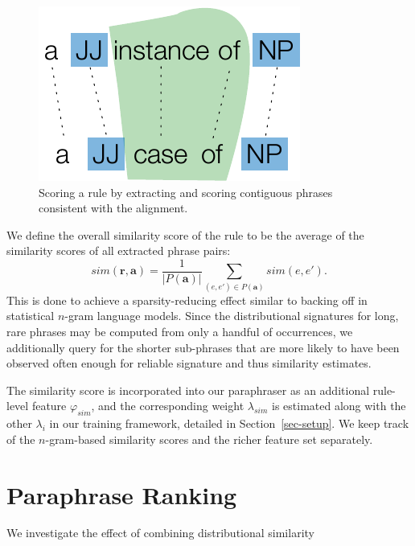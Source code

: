 \documentclass[11pt]{article}
\begin{document}
\begin{figure}[!t]
\begin{center}
\includegraphics[width=0.70\linewidth]{figures/pattern_scoring.pdf}
\end{center}
\caption{Scoring a rule by extracting and scoring contiguous phrases
  consistent with the alignment.}\label{fig-pattern-scoring}
\end{figure}

We define the overall similarity score of the rule to be the average
of the similarity scores of all extracted phrase pairs:
\begin{equation*}
  \mathit{sim}(\mathbf{r}, \mathbf{a}) = \frac{1}{|P(\mathbf{a})|}
  \sum_{(e, e') \in P(\mathbf{a})}\mathit{sim}(e, e') .
\end{equation*}
This is done to achieve a sparsity-reducing effect similar to backing
off in statistical $n$-gram language models. Since the distributional
signatures for long, rare phrases may be computed from only a handful
of occurrences, we additionally query for the shorter sub-phrases that
are more likely to have been observed often enough for reliable
signature and thus similarity estimates.

The similarity score is incorporated into our paraphraser as an
additional rule-level feature $\varphi_{\mathit{sim}}$, and the
corresponding weight $\lambda_{\mathit{sim}}$ is estimated along with
the other $\lambda_i$ in our training framework, detailed in
Section~\ref{sec-setup}. We keep track of the $n$-gram-based
similarity scores and the richer feature set separately.


\section{Paraphrase Ranking}
\label{sec-ranking}

We investigate the effect of combining distributional similarity 
\end{document}

